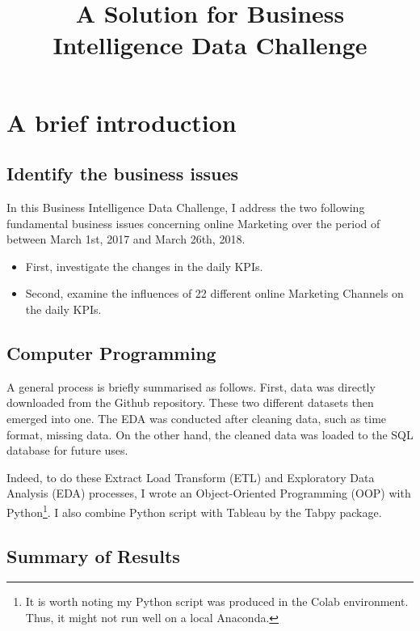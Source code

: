 \documentclass{article}
\title{A Solution for Business Intelligence Data Challenge}%
\begin{document}
\maketitle
\section{A brief introduction } \label{sec: A brief introduction}
\begin{multicols}{2}
\subsection{Identify the business issues}
In this Business Intelligence Data Challenge, I address the two following fundamental business issues concerning online Marketing over the period of between March 1st, 2017 and March 26th, 2018.

\begin{itemize} 
\item First, investigate the changes in the daily KPIs.

\item Second, examine the influences of 22 different online Marketing Channels on the daily KPIs.
\end{itemize}

\subsection{Computer Programming}

A general process is briefly summarised as follows. First, data was directly downloaded from the Github repository. These two different datasets then emerged into one. The EDA was conducted after cleaning data, such as time format, missing data. On the other hand, the cleaned data was loaded to the SQL database for future uses. 

Indeed, to do these Extract Load Transform (ETL) and  Exploratory Data Analysis (EDA) processes, I wrote an Object-Oriented Programming (OOP) with Python\footnote{It is worth noting my Python script was produced in the Colab environment. Thus, it might not run well on a local Anaconda.}. I also combine Python script with Tableau by the Tabpy package.
\subsection{Summary of Results} \label{subsec:Findings}


\end{multicols}
\end{document}
